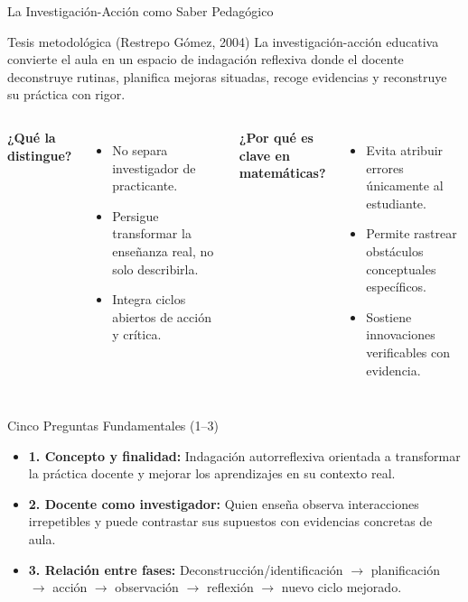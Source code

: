 \documentclass[aspectratio=169,spanish,xcolor=table]{beamer}
\begin{document}
\begin{frame}{La Investigación-Acción como Saber Pedagógico}
  \begin{block}{Tesis metodológica (Restrepo Gómez, 2004)}
    La investigación-acción educativa convierte el aula en un espacio de indagación reflexiva donde el docente deconstruye rutinas, planifica mejoras situadas, recoge evidencias y reconstruye su práctica con rigor.
  \end{block}
  \vspace{0.3cm}
  \begin{columns}[T]
      \textbf{\color{iiiepeNavy}¿Qué la distingue?}
      \begin{itemize}\scriptsize
        \item No separa investigador de practicante.
        \item Persigue transformar la enseñanza real, no solo describirla.
        \item Integra ciclos abiertos de acción y crítica.
      \end{itemize}
      \textbf{\color{iiiepeBlue}¿Por qué es clave en matemáticas?}
      \begin{itemize}\scriptsize
        \item Evita atribuir errores únicamente al estudiante.
        \item Permite rastrear obstáculos conceptuales específicos.
        \item Sostiene innovaciones verificables con evidencia.
      \end{itemize}
  \end{columns}
\end{frame}

\begin{frame}{Cinco Preguntas Fundamentales (1--3)}
  \begin{itemize}\small
    \item \textbf{\color{iiiepeNavy}1. Concepto y finalidad:} Indagación autorreflexiva orientada a transformar la práctica docente y mejorar los aprendizajes en su contexto real.
    \vspace{0.22cm}
    \item \textbf{\color{iiiepeBlue}2. Docente como investigador:} Quien enseña observa interacciones irrepetibles y puede contrastar sus supuestos con evidencias concretas de aula.
    \vspace{0.22cm}
    \item \textbf{\color{iiiepeAqua!75!black}3. Relación entre fases:} Deconstrucción/identificación $\rightarrow$ planificación $\rightarrow$ acción $\rightarrow$ observación $\rightarrow$ reflexión $\rightarrow$ nuevo ciclo mejorado.
  \end{itemize}
\end{frame}
\end{document}
